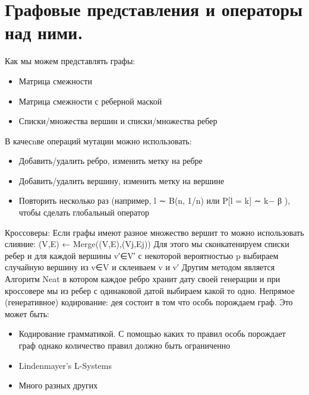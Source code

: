 \section{Графовые представления и операторы над ними.}
Как мы можем представлять графы:
\begin{itemize}
	\item Матрица смежности
	\item Матрица смежности с реберной маской
	\item Списки/множества вершин и списки/множества ребер
\end{itemize}
В качесnве операций мутации можно использовать:
\begin{itemize}
	\item Добавить/удалить ребро, изменить метку на ребре
	\item Добавить/удалить вершину, изменить метку на вершине
	\item Повторить несколько раз (например, l ∼ B(n, 1/n) или P[l = k] ∼ k− β ), чтобы сделать глобальный оператор
\end{itemize}
Кроссоверы:
Если графы имеют разное множество вершит то можно использовать слияние: (V,E) ← Merge((V,E),(Vj,Ej))
Для этого мы сконкатенируем списки ребер и для каждой вершины v′∈V′ с некоторой вероятностью p выбираем случайную вершину из v∈V и склеиваем v и v′
Другим методом является Алгоритм Neat в котором каждое ребро хранит дату своей генерации и при кроссовере мы из ребер с одинаковой датой выбираем какой то одно. 
Непрямое (генеративное) кодирование:
дея состоит в том что особь порождаем граф. Это может быть:
\begin{itemize}
	\item Кодирование грамматикой. С помощью каких то правил особь порождает граф однако количество правил должно быть ограниченно 
	\item Lindenmayer’s L-Systems
	\item Много разных других
\end{itemize}
